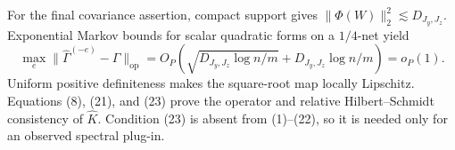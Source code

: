 For the final covariance assertion, compact support gives \(\|\Phi(W)\|_2^2\lesssim D_{J_y,J_z}\). Exponential Markov bounds for scalar quadratic forms on a \(1/4\)-net yield
\[
\max_e\|\widehat\Gamma^{(-e)}-\Gamma\|_{\mathrm{op}}
=O_P\!\left(\sqrt{D_{J_y,J_z}\log n/m}+D_{J_y,J_z}\log n/m\right)=o_P(1). \tag{23}
\]
Uniform positive definiteness makes the square-root map locally Lipschitz. Equations (8), (21), and (23) prove the operator and relative Hilbert--Schmidt consistency of \(\widehat K\). Condition (23) is absent from (1)--(22), so it is needed only for an observed spectral plug-in.